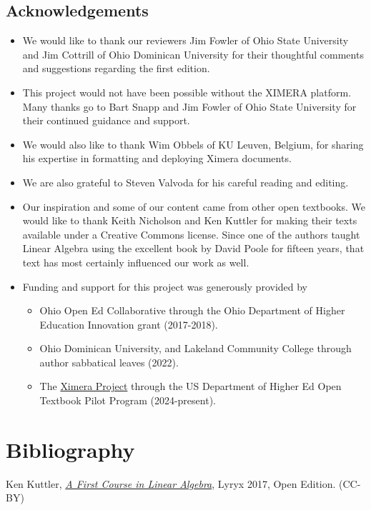 \documentclass{ximera}
\begin{document}
\subsection*{Acknowledgements}
\begin{itemize}
\item
We would like to thank our reviewers Jim Fowler of Ohio State University and Jim Cottrill of Ohio Dominican University for their thoughtful comments and suggestions regarding the first edition.  
\item This project would not have been possible without the XIMERA platform.  Many thanks go to Bart Snapp and Jim Fowler of Ohio State University for their continued guidance and support.   
\item We would also like to thank Wim Obbels of KU Leuven, Belgium, for sharing his expertise in formatting and deploying Ximera documents.
\item We are also grateful to Steven Valvoda for his careful reading and editing.
\item Our inspiration and some of our content came from other open textbooks. We would like to thank Keith Nicholson and Ken Kuttler for making their texts available under a Creative Commons license.  Since one of the authors taught Linear Algebra using the excellent book by David Poole for fifteen years, that text has most certainly influenced our work as well.
\item Funding and support for this project was generously provided by
    \begin{itemize}
        \item Ohio Open Ed Collaborative through the Ohio Department of Higher Education Innovation grant (2017-2018).
        \item Ohio Dominican University, and Lakeland Community College through author sabbatical leaves (2022).
        \item The \href{https://github.com/XimeraProject}{Ximera Project} through the US Department of Higher Ed Open Textbook Pilot Program (2024-present).
    \end{itemize}
\end{itemize}

\section*{Bibliography}

Ken Kuttler, \href{https://open.umn.edu/opentextbooks/textbooks/a-first-course-in-linear-algebra-2017}{\it A First Course in Linear Algebra}, Lyryx 2017, Open Edition. (CC-BY)
\end{document}
